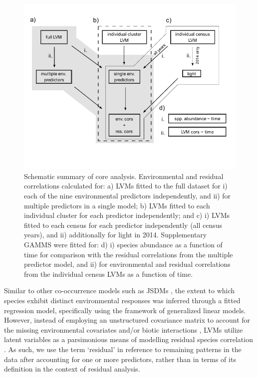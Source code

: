\begin{figure}[H]
\centering
\includegraphics[width=1.0\linewidth]{Chapter5/Figures/schem2}
\caption{Schematic summary of core analysis. Environmental and residual correlations calculated  for: a) LVMs fitted to the full  dataset for i) each of the nine environmental predictors  independently, and ii) for multiple predictors in a single model; b) LVMs fitted to each individual cluster for each predictor independently; and c) i) LVMs fitted to each census for each predictor independently (all census years), and ii) additionally for light in 2014. Supplementary GAMMS were fitted for: d) i) species abundance as a function of time for comparison with the residual correlations from the multiple predictor model, and ii) for environmental and residual correlations from the individual census LVMs as a function of time.}
\label{fig:schem}
\end{figure}

Similar to other co-occurrence models such as JSDMs \citep[e.g.,][]{Ovaskainen2010, Clark2013, Pollock2014}, the extent to which species exhibit distinct environmental responses was inferred through a fitted regression model, specifically using the framework of generalized linear models. However, instead of employing an unstructured covariance matrix to account for the missing environmental covariates and/or biotic interactions \citep[as was done in][for instance]{Ovaskainen2010, Pollock2014}, LVMs utilize latent variables as a parsimonious means of modelling residual species correlation \citep[see also][]{Harris2015}. As such, we use the term `residual' in reference to remaining patterns in the data after accounting for one or more predictors, rather than in terms of its definition in the context of residual analysis. 

